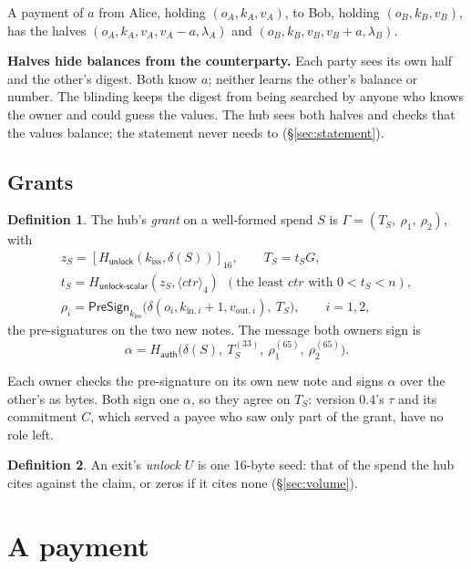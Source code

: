 \documentclass[11pt]{article}
\theoremstyle{plain}
\theoremstyle{definition}
\newtheorem{definition}{Definition}
\newcommand{\be}[2]{\langle #1\rangle_{#2}}
\newcommand{\pre}[2]{[#1]_{#2}}
\newcommand{\Ht}[1]{H_{\textsf{#1}}}
\newcommand{\PSign}{\mathsf{PreSign}}
\newcommand{\kiss}{k_{\mathrm{iss}}}
\begin{document}
A payment of $a$ from Alice, holding $(o_A, k_A, v_A)$, to Bob, holding
$(o_B, k_B, v_B)$, has the halves $(o_A, k_A, v_A, v_A - a, \lambda_A)$
and $(o_B, k_B, v_B, v_B + a, \lambda_B)$.

\textbf{Halves hide balances from the counterparty.} Each party sees
its own half and the other's digest. Both know $a$; neither learns the
other's balance or number. The blinding keeps the digest from being
searched by anyone who knows the owner and could guess the values. The
hub sees both halves and checks that the values balance; the statement
never needs to (\S\ref{sec:statement}).

\subsection{Grants}\label{sec:grant}

\begin{definition}
The hub's \emph{grant} on a well-formed spend $S$ is $\Gamma = (T_S,\
\rho_1,\ \rho_2)$, with
\begin{gather*}
  z_S = \pre{\Ht{unlock}(\kiss, \delta(S))}{16},\qquad T_S = t_S G,\\
  t_S = \Ht{unlock-scalar}(z_S, \be{\mathit{ctr}}{4})\ \ (\text{the least
  } \mathit{ctr} \text{ with } 0 < t_S < n),\\
  \rho_i = \PSign_{\kiss}\big(\delta(o_i, k_{\mathrm{in},i} + 1,
  v_{\mathrm{out},i}),\ T_S\big),\qquad i = 1, 2,
\end{gather*}
the pre-signatures on the two new notes. The message both owners sign is
\[
  \alpha = \Ht{auth}\big(\delta(S),\ T_S^{(33)},\ \rho_1^{(65)},\
  \rho_2^{(65)}\big).
\]
\end{definition}

Each owner checks the pre-signature on its own new note and signs
$\alpha$ over the other's as bytes. Both sign one $\alpha$, so they
agree on $T_S$: version 0.4's $\tau$ and its commitment $C$, which
served a payee who saw only part of the grant, have no role left.

\begin{definition}
An exit's \emph{unlock} $U$ is one 16-byte seed: that of the spend the
hub cites against the claim, or zeros if it cites none
(\S\ref{sec:volume}).
\end{definition}

\section{A payment}\label{sec:payment}
\end{document}
